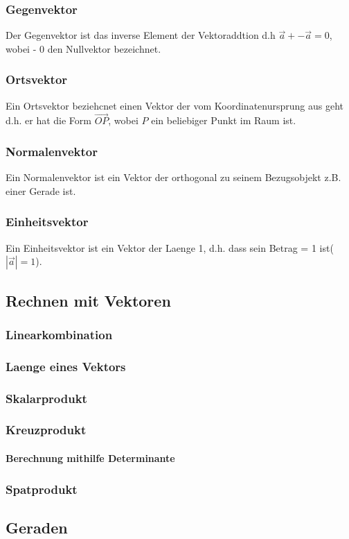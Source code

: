 \documentclass[a4paper]{article} %
\begin{document}
	\subsubsection{Gegenvektor}
	Der Gegenvektor ist das inverse Element der Vektoraddtion d.h $ \vec{a}+ -\vec{a}=0$, wobei - $0$ den Nullvektor bezeichnet.
	\subsubsection{Ortsvektor}
	Ein Ortsvektor beziehcnet einen Vektor der vom Koordinatenursprung aus geht d.h. er hat die Form $\vec{OP}$, wobei $P$ ein beliebiger Punkt im Raum ist.
	\subsubsection{Normalenvektor}
	Ein Normalenvektor ist ein Vektor der orthogonal zu seinem Bezugsobjekt z.B. einer Gerade ist. 
	\subsubsection{Einheitsvektor}
	Ein Einheitsvektor ist ein Vektor der Laenge 1, d.h. dass sein Betrag = 1 ist($|\vec{a}|=1$).
	\subsection{Rechnen mit Vektoren}
	\subsubsection{Linearkombination}
	\subsubsection{Laenge eines Vektors}
	\subsubsection{Skalarprodukt}
	\subsubsection{Kreuzprodukt}
	\paragraph{Berechnung mithilfe Determinante}
	\subsubsection{Spatprodukt}
	\subsection{Geraden}
\end{document}
